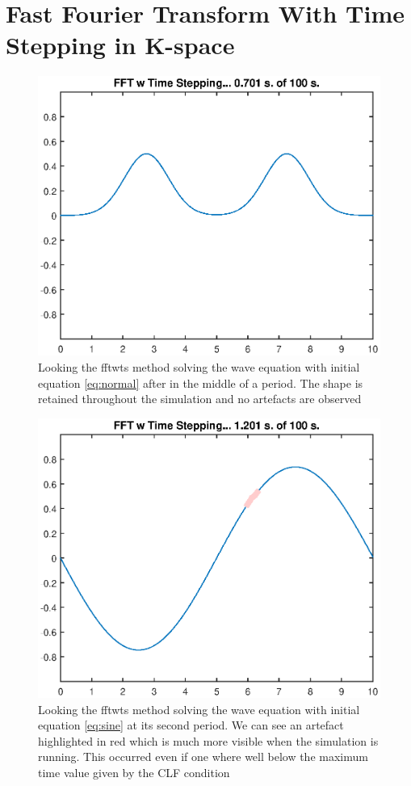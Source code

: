 \documentclass[11pt]{article}
\begin{document}
\section{Fast Fourier Transform With Time Stepping in K-space}
 \begin{figure}[H]
	\centering
	\includegraphics[width=1\textwidth]{../fftwtsNormal}
	\caption{Looking the fftwts method solving the wave equation with initial equation 
	\ref{eq:normal} after in the middle of a period. The shape is retained throughout the simulation and no artefacts are observed}
	\label{fig:fftwtsNormal}
\end{figure}
\begin{figure}[H]
	\centering
	\includegraphics[width=1\textwidth]{../fftwtsSine}
	\caption{Looking the fftwts method solving the wave equation with initial equation 
	\ref{eq:sine} at its second period. We can see an artefact highlighted in red which is much more visible when the simulation is running. This occurred even if one where well below the maximum time value given by the CLF condition}
	\label{fig:fftwtsSine}
\end{figure}
\end{document}
